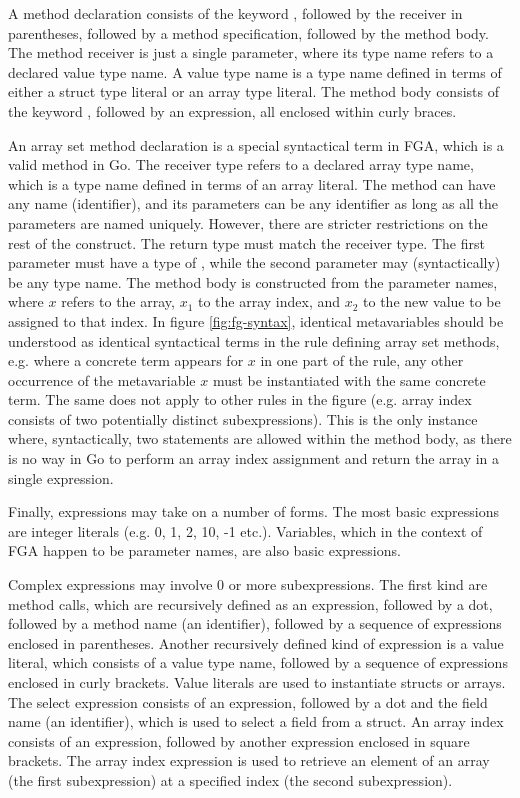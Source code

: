 A method declaration consists of the keyword \func, followed by the receiver in
parentheses, followed by a method specification, followed by the method body.
The method receiver is just a single parameter, where its type name refers to a
declared value type name. A value type name is a type name defined in terms of
either a struct type literal or an array type literal. The method body consists
of the keyword \return, followed by an expression, all enclosed within curly
braces.

An array set method declaration is a special syntactical term in FGA, which is a
valid method in Go. The receiver type refers to a declared array type name,
which is a type name defined in terms of an array literal. The method can have
any name (identifier), and its parameters can be any identifier as long as all
the parameters are named uniquely. However, there are stricter restrictions on
the rest of the construct. The return type must match the receiver type. The
first parameter must have a type of , while the second parameter may
(syntactically) be any type name. The method body is constructed from the
parameter names, where $x$ refers to the array, $x_1$ to the array index, and
$x_2$ to the new value to be assigned to that index. In figure
\ref{fig:fg-syntax}, identical metavariables should be understood as identical
syntactical terms in the rule defining array set methods, e.g. where a concrete
term appears for $x$ in one part of the rule, any other occurrence of the
metavariable $x$ must be instantiated with the same concrete term. The same does
not apply to other rules in the figure (e.g. array index consists of two
potentially distinct subexpressions). This is the only instance where,
syntactically, two statements are allowed within the method body, as there is no
way in Go to perform an array index assignment and return the array in a single
expression.

Finally, expressions may take on a number of forms. The most basic expressions
are integer literals (e.g. 0, 1, 2, 10, -1 etc.). Variables, which in the
context of FGA happen to be parameter names, are also basic expressions.

Complex expressions may involve 0 or more subexpressions. The first kind are
method calls, which are recursively defined as an expression, followed by a dot,
followed by a method name (an identifier), followed by a sequence of expressions
enclosed in parentheses. Another recursively defined kind of expression is a
value literal, which consists of a value type name, followed by a sequence of
expressions enclosed in curly brackets. Value literals are used to instantiate
structs or arrays. The select expression consists of an expression, followed by
a dot and the field name (an identifier), which is used to select a field from a
struct. An array index consists of an expression, followed by another expression
enclosed in square brackets. The array index expression is used to retrieve an
element of an array (the first subexpression) at a specified index (the second
subexpression).

